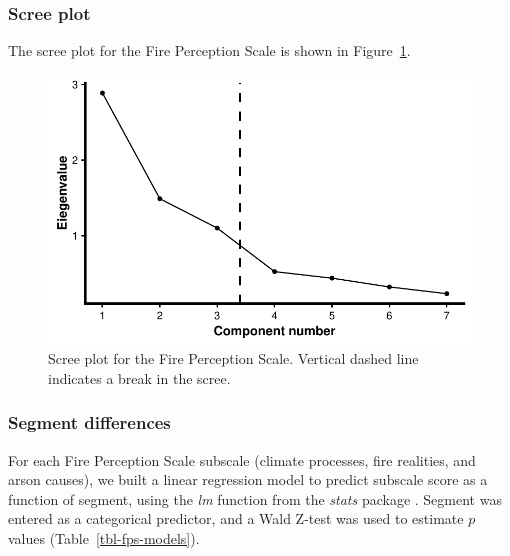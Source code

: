 \documentclass[
  letterpaper,
  DIV=11,
  numbers=noendperiod]{scrartcl}
\begin{document}
\hypertarget{scree-plot}{%
\subsubsection{Scree plot}\label{scree-plot}}

The scree plot for the Fire Perception Scale is shown in
Figure~\ref{fig-fps-scree}.

\begin{figure}

{\centering \includegraphics{supplement_files/figure-pdf/fig-fps-scree-1.pdf}

}

\caption{\label{fig-fps-scree}Scree plot for the Fire Perception Scale.
Vertical dashed line indicates a break in the scree.}

\end{figure}

\hypertarget{segment-differences}{%
\subsubsection{Segment differences}\label{segment-differences}}

For each Fire Perception Scale subscale (climate processes, fire
realities, and arson causes), we built a linear regression model to
predict subscale score as a function of segment, using the \emph{lm}
function from the \emph{stats} package \citep{rcoreteam_2023}. Segment
was entered as a categorical predictor, and a Wald Z-test was used to
estimate \(p\) values (Table~\ref{tbl-fps-models}).
\end{document}
